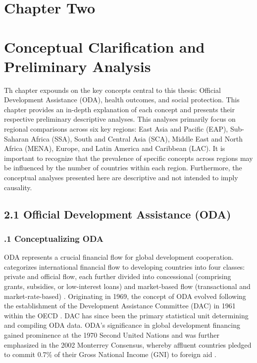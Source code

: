 \section*{\centering Chapter Two}
\section*{\centering Conceptual Clarification and Preliminary Analysis}
Th chapter expounds on the key concepts central to this thesis: Official Development Assistance (ODA), health outcomes, and social protection. This chapter provides an in-depth explanation of each concept and presents their respective preliminary descriptive analyses. This analyses primarily focus on regional comparisons across six key regions: East Asia and Pacific (EAP), Sub-Saharan Africa (SSA), South and Central Asia (SCA), Middle East and North Africa (MENA), Europe, and Latin America and Caribbean (LAC). It is important to recognize that the prevalence of specific concepts across regions may be influenced by the number of countries within each region. Furthermore, the conceptual analyses presented here are descriptive and not intended to imply causality.

\subsection*{2.1 Official Development Assistance (ODA)}
\subsubsection*{.1 Conceptualizing ODA}

ODA represents a crucial financial flow for global development cooperation. \textcite{scott_lessons_2020} categorizes international financial flow to developing countries into four classes: private and official flow, each further divided into concessional (comprising grants, subsidies, or low-interest loans) and market-based flow (transactional and market-rate-based) \parencite{scott_lessons_2020}. Originating in 1969, the concept of ODA evolved following the establishment of the Development Assistance Committee (DAC) in 1961 within the OECD \parencite{scott_lessons_2020}. DAC has since been the primary statistical unit determining and compiling ODA data. ODA's significance in global development financing gained prominence at the 1970 Second United Nations and was further emphasized in the 2002 Monterrey Consensus, whereby affluent countries pledged to commit 0.7\% of their Gross National Income (GNI) to foreign aid \parencite{scott_lessons_2020}.

